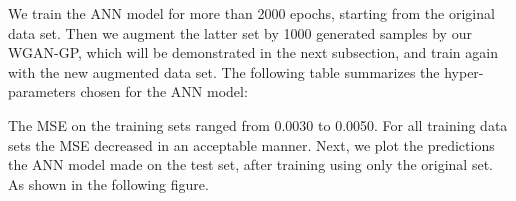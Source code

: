 \documentclass[draft, a4, 10pt, onecolumn]{IEEEtran}
\begin{document}
We train the ANN model for more than 2000 epochs, starting from the original data set. Then we augment the latter set by 1000 generated samples by our WGAN-GP, which will be demonstrated in the next subsection, and train again with the new augmented data set. The following table summarizes the hyper-parameters chosen for the ANN model:
\begin{table}[h]
\centering
{}
\caption{Hyper-parameters chosen for the ANN model, where $\beta_{1}$ and $\beta_{2}$ are a part of Adam parameters}
\end{table}

\newpage
The MSE on the training sets ranged from 0.0030 to 0.0050. For all training data sets the MSE decreased in an acceptable manner. Next, we plot the predictions the ANN model made on the test set, after training using only the original set. As shown in the following figure.
\end{document}
